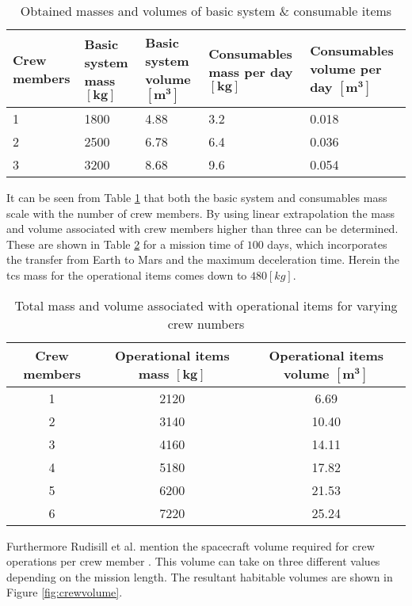 \begin{table}[h]
	\centering
	\caption{Obtained masses and volumes of basic system \& consumable items}
	\begin{tabular}{|p{1.87cm}|p{2.625cm}|p{2.65cm}|p{3.6cm}|p{3.6cm}|}
		\hline
		\textbf{Crew members} & \textbf{Basic system mass $\mathbf{[kg]}$} & \textbf{Basic system volume $\mathbf{[m^{3}]}$} & \textbf{Consumables mass per day $\mathbf{[kg]}$} & \textbf{Consumables volume per day $\mathbf{[m^{3}]}$} \\ \hline \hline
		1 & 1800 & 4.88 & 3.2 & 0.018 \\
		2 & 2500 & 6.78 & 6.4 & 0.036 \\
		3 & 3200 & 8.68 & 9.6 & 0.054 \\
		\hline
	\end{tabular}
	\label{tab:operationalest}
\end{table}

It can be seen from Table \ref{tab:operationalest} that both the basic system and consumables mass scale with the number of crew members. By using linear extrapolation the mass and volume associated with crew members higher than three can be determined. These are shown in Table \ref{tab:crewmemberops} for a mission time of $100$ days, which incorporates the transfer from Earth to Mars and the maximum deceleration time. Herein the \gls{tcs} mass for the operational items comes down to $480 \left[kg\right]$.\\

\begin{table}[h]
	\centering
	\caption[Total mass and volume associated with operational items]{Total mass and volume associated with operational items for varying crew numbers}
	\begin{tabular}{|c|c|c|}
		\hline
		\textbf{Crew members} & \textbf{Operational items mass $\mathbf{[kg]}$} & \textbf{Operational items volume $\mathbf{[m^{3}]}$}\\ \hline \hline
		1 & 2120 & 6.69\\
		2 & 3140 & 10.40\\
		3 & 4160 & 14.11\\
		4 & 5180 & 17.82\\
		5 & 6200 & 21.53\\
		6 & 7220 & 25.24\\ \hline
	\end{tabular}
	\label{tab:crewmemberops}
\end{table}

Furthermore Rudisill et al. mention the spacecraft volume required for crew operations per crew member \cite{Rudisill2008}. This volume can take on three different values depending on the mission length. The resultant habitable volumes are shown in Figure \ref{fig:crewvolume}.

